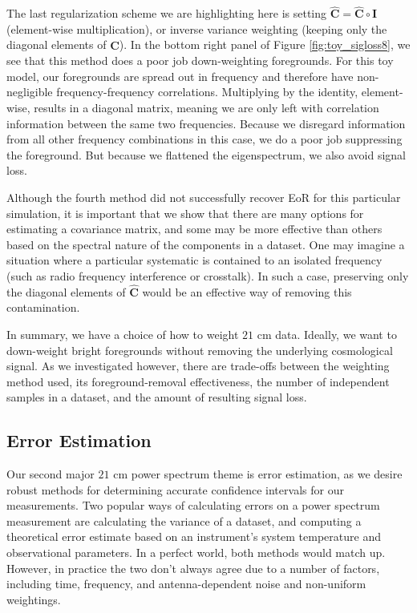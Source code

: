 \documentclass[preprint2,numberedappendix,tighten]{aastex6}  %
\begin{document}
The last regularization scheme we are highlighting here is setting $\hat{\textbf{C}} = \hat{\textbf{C}} \circ \textbf{I}$ (element-wise multiplication), or inverse variance weighting (keeping only the diagonal elements of $\hat{\textbf{C}}$). In the bottom right 
panel of Figure \ref{fig:toy_sigloss8}, we see that this method does a poor job down-weighting foregrounds. For this toy model, 
our foregrounds are spread out in frequency and therefore have non-negligible frequency-frequency correlations. Multiplying by 
the identity, element-wise, results in a diagonal matrix, meaning we are only left with correlation information between the same 
two frequencies. Because we disregard information from all other frequency combinations in this case, we do a poor job 
suppressing the foreground. But because we flattened the eigenspectrum, we also avoid signal loss. 

Although the fourth method did not successfully recover EoR for this particular simulation, it is important that we show that there 
are many options for estimating a covariance matrix, and some may be more effective than others based on the spectral nature 
of the components in a dataset. One may imagine a situation where a particular systematic is contained to an isolated 
frequency (such as radio frequency interference or crosstalk). In such a case, preserving only the diagonal elements of $
\hat{\textbf{C}}$ would be an effective way of removing this contamination. 

In summary, we have a choice of how to weight $21$ cm data. Ideally, we want to down-weight bright foregrounds without 
removing the underlying cosmological signal. As we investigated however, there are trade-offs between the weighting method 
used, its foreground-removal effectiveness, the number of independent samples in a dataset, and the amount of resulting signal loss. 


\subsection{Error Estimation}
\label{sec:ErrorOverview}

Our second major $21$ cm power spectrum theme is error estimation, as we desire robust methods for determining accurate 
confidence intervals for our measurements. Two popular ways of calculating errors on a power spectrum 
measurement are calculating the variance of a dataset, and computing a theoretical error estimate based on an instrument's 
system temperature and observational parameters. In a perfect world, both methods would match up. However, in practice the 
two don't always agree due to a number of factors, including time, frequency, and antenna-dependent noise and non-uniform 
weightings. 
\end{document}
